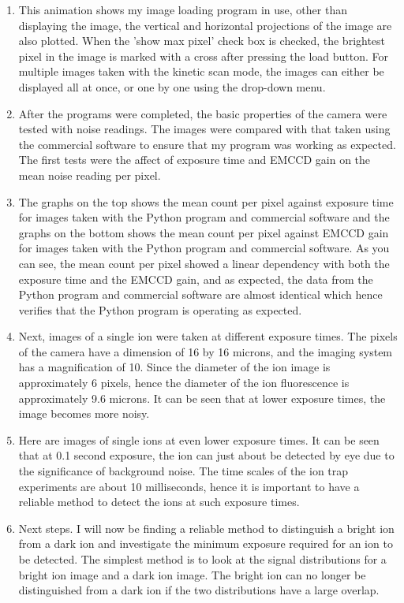 \documentclass[12pt]{article}
\begin{document}
\begin{enumerate}
\item This animation shows my image loading program in use, other than displaying the image, the vertical and horizontal projections of the image are also plotted. When the 'show max pixel' check box is checked, the brightest pixel in the image is marked with a cross after pressing the load button. For multiple images taken with the kinetic scan mode, the images can either be displayed all at once, or one by one using the drop-down menu.

\item After the programs were completed, the basic properties of the camera were tested with noise readings. The images were compared with that taken using the commercial software to ensure that my program was working as expected. The first tests were the affect of exposure time and EMCCD gain on the mean noise reading per pixel.

\item The graphs on the top shows the mean count per pixel against exposure time for images taken with the Python program and commercial software and the graphs on the bottom shows the mean count per pixel against EMCCD gain for images taken with the Python program and commercial software. As you can see, the mean count per pixel showed a linear dependency with both the exposure time and the EMCCD gain, and as expected, the data from the Python program and commercial software are almost identical which hence verifies that the Python program is operating as expected.

\pagebreak

\item Next, images of a single ion were taken at different exposure times. The pixels of the camera have a dimension of 16 by 16 microns, and the imaging system has a magnification of 10. Since the diameter of the ion image is approximately 6 pixels, hence the diameter of the ion fluorescence is approximately 9.6 microns. It can be seen that at lower exposure times, the image becomes more noisy.

\item Here are images of single ions at even lower exposure times. It can be seen that at 0.1 second exposure, the ion can just about be detected by eye due to the significance of background noise. The time scales of the ion trap experiments are about 10 milliseconds, hence it is important to have a reliable method to detect the ions at such exposure times.

\item Next steps. I will now be finding a reliable method to distinguish a bright ion from a dark ion and investigate the minimum exposure required for an ion to be detected. The simplest method is to look at the signal distributions for a bright ion image and a dark ion image. The bright ion can no longer be distinguished from a dark ion if the two distributions have a large overlap.


\end{enumerate}
\end{document}
